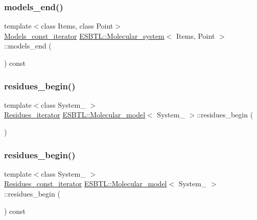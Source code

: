 \subsubsection{\texorpdfstring{models\+\_\+end()}{models\_end()}\hspace{0.1cm}{\footnotesize\ttfamily [2/2]}}
{\footnotesize\ttfamily template$<$class Items, class Point$>$ \\
\hyperlink{group__grp__iters_ga6383c53b86af7a7a7376bce06e4febb8}{Models\+\_\+const\+\_\+iterator} \hyperlink{classESBTL_1_1Molecular__system}{E\+S\+B\+T\+L\+::\+Molecular\+\_\+system}$<$ Items, Point $>$\+::models\+\_\+end (\begin{DoxyParamCaption}{ }\end{DoxyParamCaption}) const\hspace{0.3cm}{\ttfamily [inline]}}

\mbox{\label{group__grp__iters_ga8b8a40a8fd62a11dc2dd8c23dec80324}} 
\subsubsection{\texorpdfstring{residues\+\_\+begin()}{residues\_begin()}\hspace{0.1cm}{\footnotesize\ttfamily [1/4]}}
{\footnotesize\ttfamily template$<$class System\+\_\+ $>$ \\
\hyperlink{group__grp__iters_gae3b7c7057b27581b14109723b28a3abd}{Residues\+\_\+iterator} \hyperlink{classESBTL_1_1Molecular__model}{E\+S\+B\+T\+L\+::\+Molecular\+\_\+model}$<$ System\+\_\+ $>$\+::residues\+\_\+begin (\begin{DoxyParamCaption}{ }\end{DoxyParamCaption})\hspace{0.3cm}{\ttfamily [inline]}}

\mbox{\label{group__grp__iters_ga0a02b98e1bdc627ffcf0ab01f1c82092}} 
\subsubsection{\texorpdfstring{residues\+\_\+begin()}{residues\_begin()}\hspace{0.1cm}{\footnotesize\ttfamily [2/4]}}
{\footnotesize\ttfamily template$<$class System\+\_\+ $>$ \\
\hyperlink{group__grp__iters_gab9417777a325c8ca02089328a4468703}{Residues\+\_\+const\+\_\+iterator} \hyperlink{classESBTL_1_1Molecular__model}{E\+S\+B\+T\+L\+::\+Molecular\+\_\+model}$<$ System\+\_\+ $>$\+::residues\+\_\+begin (\begin{DoxyParamCaption}{ }\end{DoxyParamCaption}) const\hspace{0.3cm}{\ttfamily [inline]}}

